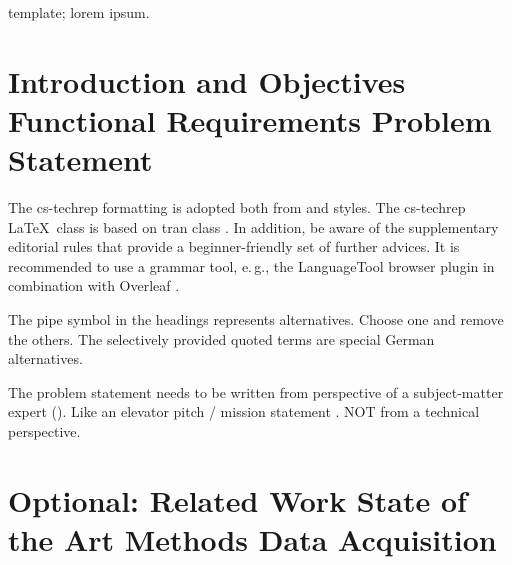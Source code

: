 \documentclass[conference,a4paper,flushend]{cs-techrep}
\begin{document}
\selectlanguage{\cstechrepLang}

\maketitle

\begin{abstract}
	\lipsum[1][3-10]
	\{\,\faWarning{}The abstract does neither mention a teaching module nor a team/project,
	it is a summary of the content of the technical report, thus, the objectives and architecture.\}
\end{abstract}

\begin{IEEEkeywords}
	template; lorem ipsum.
\end{IEEEkeywords}

\section{Introduction and Objectives \textbar{} Functional Requirements \textbar{} Problem Statement}

The cs-techrep formatting is adopted both from  \cite{ieee2018formattingrules} and  \cite{iaria2014formattingrules} styles.
The cs-techrep \LaTeX\ class is based on tran class \cite{ieee2015howto}.
In addition, be aware of the supplementary  editorial rules \cite{iaria2009editorialrules} \faWarning{} that provide a beginner-friendly set of further advices.
It is recommended to use a grammar tool, e.\,g., the LanguageTool \cite{languagetool} browser plugin in combination with Overleaf \cite{overleaf}.

The pipe symbol \textquote{\textbar{}} in the headings represents alternatives. Choose one and remove the others. The selectively provided quoted terms are special German alternatives.

The problem statement needs to be written from perspective of a subject-matter expert (). Like an elevator pitch / mission statement \faWarning{}. NOT from a technical perspective.

\section{Optional: Related Work \textbar{} State of the Art \textbar{} Methods \textbar{} Data Acquisition}
\lipsum[2]
\end{document}
